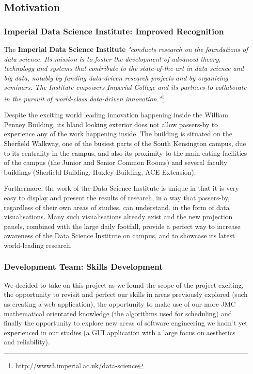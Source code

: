 \documentclass[a4paper, titlepage]{article}
\begin{document}
\subsection{Motivation}

\subsubsection{Imperial Data Science Institute: Improved Recognition}
The \textbf{Imperial Data Science Institute} \textit{"conducts research on the foundations of data science. Its mission is to foster the development of advanced theory, technology and systems that contribute to the state-of-the-art in data science and big data, notably by funding data-driven research projects and by organizing seminars. The Institute empowers Imperial College and its partners to collaborate in the pursuit of world-class data-driven innovation."}\footnote{http://www3.imperial.ac.uk/data-science}

Despite the exciting world leading innovation happening inside the William Penney Building, its bland looking exterior does not allow passers-by to experience any of the work happening inside. The building is situated on the Sherfield Walkway, one of the busiest parts of the South Kensington campus, due to its centrality in the campus, and also its proximity to the main eating facilities of the campus (the Junior and Senior Common Rooms) and several faculty buildings (Sherfield Building, Huxley Building, ACE Extension). 

Furthermore, the work of the Data Science Institute is unique in that it is very easy to display and present the results of research, in a way that passers-by, regardless of their own areas of studies, can understand, in the form of data visualisations. Many such visualisations already exist and the new projection panels, combined with the large daily footfall, provide a perfect way to increase awareness of the Data Science Institute on campus, and to showcase its latest world-leading research.

\subsubsection{Development Team: Skills Development}
We decided to take on this project as we found the scope of the project exciting, the opportunity to revisit and perfect our skills in areas previously explored (such as creating a web application), the opportunity to make use of our more JMC mathematical orientated knowledge (the algorithms used for scheduling) and finally the opportunity to explore new areas of software engineering we hadn't yet experienced in our studies (a GUI application with a large focus on aesthetics and reliability).
\end{document}
